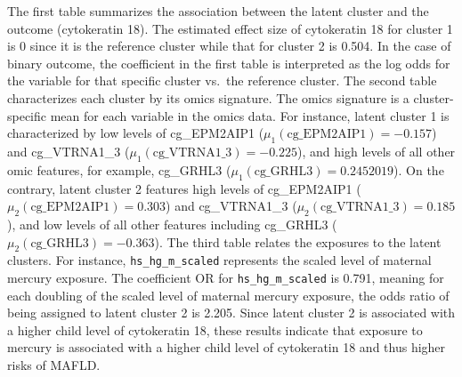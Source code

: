 The first table summarizes the association between the latent cluster
and the outcome (cytokeratin 18). The estimated effect size of
cytokeratin 18 for cluster 1 is 0 since it is the reference cluster
while that for cluster 2 is 0.504. In the case of binary outcome, the
coefficient in the first table is interpreted as the log odds for the
variable for that specific cluster vs.~the reference cluster. The second
table characterizes each cluster by its omics signature. The omics
signature is a cluster-specific mean for each variable in the omics
data. For instance, latent cluster 1 is characterized by low levels of
cg\_EPM2AIP1 (\(\mu_1 (\text{cg{\_}EPM2AIP1})= -0.157\)) and cg\_VTRNA1\_3
(\(\mu_1 (\text{cg{\_}VTRNA1{\_}3})= -0.225\)), and high levels of all
other omic features, for example, cg\_GRHL3
(\(\mu_1 (\text{cg{\_}GRHL3})= 0.2452019\)). On the contrary, latent
cluster 2 features high levels of cg\_EPM2AIP1
(\(\mu_2 (\text{cg{\_}EPM2AIP1})=  0.303\)) and cg\_VTRNA1\_3
(\(\mu_2 (\text{cg{\_}VTRNA1{\_}3})= 0.185\)), and low levels of all other
features including cg\_GRHL3 (\(\mu_2 (\text{cg{\_}GRHL3})= -0.363\)). The
third table relates the exposures to the latent clusters. For instance,
\texttt{hs\textasciigrave{}\textasciigrave{}\_\textasciigrave{}\textasciigrave{}hg\textasciigrave{}\textasciigrave{}\_\textasciigrave{}\textasciigrave{}m\textasciigrave{}\textasciigrave{}\_\textasciigrave{}\textasciigrave{}scaled} represents the scaled level of maternal
mercury exposure. The coefficient OR for \texttt{hs\textasciigrave{}\textasciigrave{}\_\textasciigrave{}\textasciigrave{}hg\textasciigrave{}\textasciigrave{}\_\textasciigrave{}\textasciigrave{}m\textasciigrave{}\textasciigrave{}\_\textasciigrave{}\textasciigrave{}scaled} is
0.791, meaning for each doubling of the scaled level of maternal mercury
exposure, the odds ratio of being assigned to latent cluster 2 is 2.205.
Since latent cluster 2 is associated with a higher child level of
cytokeratin 18, these results indicate that exposure to mercury is
associated with a higher child level of cytokeratin 18 and thus higher
risks of MAFLD.

